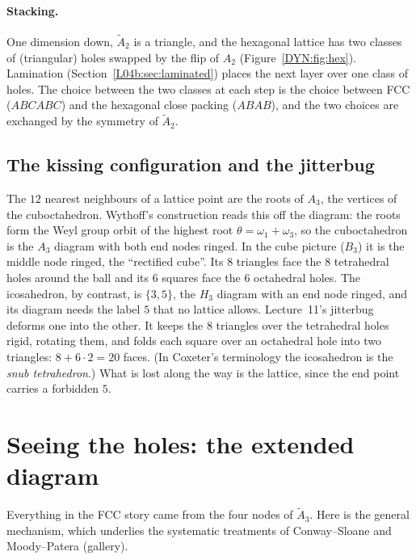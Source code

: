 \documentclass[11pt,openany]{book}
\theoremstyle{plain}
\theoremstyle{definition}
\theoremstyle{remark}
\begin{document}
\paragraph{Stacking.} One dimension down, $\tilde A_2$ is a triangle, and the hexagonal lattice has two
classes of (triangular) holes swapped by the flip of $A_2$ (Figure~\ref{DYN:fig:hex}). Lamination
(Section~\ref{L04b:sec:laminated}) places the next layer over one class of holes. The choice between the two
classes at each step is the choice between FCC ($ABCABC$) and the hexagonal close packing ($ABAB$),
and the two choices are exchanged by the symmetry of $\tilde A_2$.

\subsection*{The kissing configuration and the jitterbug}
The $12$ nearest neighbours of a lattice point are the roots of $A_3$, the vertices of the
cuboctahedron. Wythoff's construction reads this off the diagram: the roots form the Weyl group orbit
of the highest root $\theta=\omega_1+\omega_3$, so the cuboctahedron is the $A_3$ diagram with both
end nodes ringed. In the cube picture ($B_3$) it is the middle node ringed, the ``rectified cube''. Its
$8$ triangles face the $8$ tetrahedral holes around the ball and its $6$ squares face the $6$ octahedral
holes. The icosahedron, by contrast, is $\{3,5\}$, the $H_3$ diagram with an end node ringed, and its
diagram needs the label $5$ that no lattice allows. Lecture~11's jitterbug deforms one into the other. It
keeps the $8$ triangles over the tetrahedral holes rigid, rotating them, and folds each square over an
octahedral hole into two triangles: $8+6\cdot2=20$ faces. (In Coxeter's terminology the icosahedron is the
\emph{snub tetrahedron}.) What is lost along the way is the
lattice, since the end point carries a forbidden $5$.

\section{Seeing the holes: the extended diagram}
\label{DYN:sec:holes}

Everything in the FCC story came from the four nodes of $\tilde A_3$. Here is the general mechanism,
which underlies the systematic treatments of Conway--Sloane and Moody--Patera (gallery).
\end{document}
